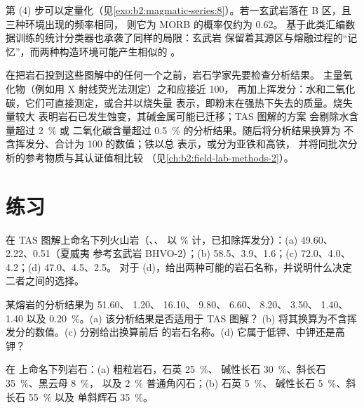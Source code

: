 第 (4) 步可以定量化（见\cref{exo:b2:magmatic-series:8}）。若一玄武岩落在 B 区，且三种环境出现的频率相同，
则它为 MORB 的概率仅约为 0.62。
基于此类汇编数据训练的统计分类器也承袭了同样的局限：玄武岩
保留着其源区与熔融过程的“记忆”，而两种构造环境可能产生相似的
。

\begin{inthelab}[检查全岩分析]
在把岩石投到这些图解中的任何一个之前，岩石学家先要检查分析结果。
主量氧化物（例如用 X 射线荧光法测定）之和应接近 100，
再加上挥发分：水和二氧化碳，它们可直接测定，或合并以烧失量
表示，即粉末在强热下失去的质量。烧失量较大
表明岩石已发生蚀变，其碱金属可能已迁移；TAS 图解的方案
会剔除水含量超过 \qty{2}{\percent} 或
二氧化碳含量超过 \qty{0.5}{\percent} 的分析结果。随后将分析结果换算为
不含挥发分、合计为 100 的数值；铁以总  表示，或分为亚铁和高铁，
并将同批次分析的参考物质与其认证值相比较
（见\cref{ch:b2:field-lab-methods-2}）。
\end{inthelab}

\section{练习}

\begin{exercise}[$\star$]\label{exo:b2:magmatic-series:1}
在 TAS 图解上命名下列火山岩（、、
以 \unit{\percent} 计，已扣除挥发分）：(a) 49.60、2.22、0.51（夏威夷
参考玄武岩 BHVO-2）；(b) 58.5、3.9、1.6；(c) 72.0、4.0、4.2；(d) 47.0、4.5、2.5。
对于 (d)，给出两种可能的岩石名称，并说明什么决定二者之间的选择。
\end{exercise}

\begin{exercise}[$\star$]\label{exo:b2:magmatic-series:2}
某熔岩的分析结果为  51.60、 1.20、 16.10、 9.80、
 6.60、 8.20、 3.50、 1.40、 1.40 以及
 \qty{0.20}{\percent}。(a) 该分析结果是否适用于 TAS 图解？
(b) 将其换算为不含挥发分的数值。(c) 分别给出换算前后
的岩石名称。(d) 它属于低钾、中钾还是高钾？
\end{exercise}

\begin{exercise}[$\star$]\label{exo:b2:magmatic-series:3}
在 上命名下列岩石：(a) 粗粒岩石，石英 \qty{25}{\percent}、
碱性长石 \qty{30}{\percent}、斜长石 \qty{35}{\percent}、黑云母 \qty{8}{\percent}，
以及 \qty{2}{\percent} 普通角闪石；(b) 石英 \qty{5}{\percent}、
碱性长石 \qty{5}{\percent}、斜长石 \qty{55}{\percent} 以及
单斜辉石 \qty{35}{\percent}。
\end{exercise}

